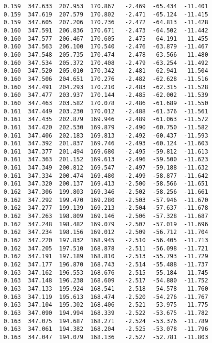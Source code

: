 \begin{verbatim}
   0.159  347.633  207.953  170.867   -2.469  -65.434  -11.401
   0.159  347.619  207.579  170.802   -2.471  -65.124  -11.415
   0.159  347.605  207.206  170.736   -2.472  -64.813  -11.428
   0.160  347.591  206.836  170.671   -2.473  -64.502  -11.442
   0.160  347.577  206.467  170.605   -2.475  -64.191  -11.455
   0.160  347.563  206.100  170.540   -2.476  -63.879  -11.467
   0.160  347.548  205.735  170.474   -2.478  -63.566  -11.480
   0.160  347.534  205.372  170.408   -2.479  -63.254  -11.492
   0.160  347.520  205.010  170.342   -2.481  -62.941  -11.504
   0.160  347.506  204.651  170.276   -2.482  -62.628  -11.516
   0.160  347.491  204.293  170.210   -2.483  -62.315  -11.528
   0.160  347.477  203.937  170.144   -2.485  -62.002  -11.539
   0.160  347.463  203.582  170.078   -2.486  -61.689  -11.550
   0.161  347.449  203.230  170.012   -2.488  -61.376  -11.561
   0.161  347.435  202.879  169.946   -2.489  -61.063  -11.572
   0.161  347.420  202.530  169.879   -2.490  -60.750  -11.582
   0.161  347.406  202.183  169.813   -2.492  -60.437  -11.593
   0.161  347.392  201.837  169.746   -2.493  -60.124  -11.603
   0.161  347.377  201.494  169.680   -2.495  -59.812  -11.613
   0.161  347.363  201.152  169.613   -2.496  -59.500  -11.623
   0.161  347.349  200.812  169.547   -2.497  -59.188  -11.632
   0.161  347.334  200.474  169.480   -2.499  -58.877  -11.642
   0.161  347.320  200.137  169.413   -2.500  -58.566  -11.651
   0.162  347.306  199.803  169.346   -2.502  -58.256  -11.661
   0.162  347.292  199.470  169.280   -2.503  -57.946  -11.670
   0.162  347.277  199.139  169.213   -2.504  -57.637  -11.678
   0.162  347.263  198.809  169.146   -2.506  -57.328  -11.687
   0.162  347.248  198.482  169.079   -2.507  -57.019  -11.696
   0.162  347.234  198.156  169.012   -2.509  -56.712  -11.704
   0.162  347.220  197.832  168.945   -2.510  -56.405  -11.713
   0.162  347.205  197.510  168.878   -2.511  -56.098  -11.721
   0.162  347.191  197.189  168.810   -2.513  -55.793  -11.729
   0.162  347.177  196.870  168.743   -2.514  -55.488  -11.737
   0.163  347.162  196.553  168.676   -2.515  -55.184  -11.745
   0.163  347.148  196.238  168.609   -2.517  -54.880  -11.752
   0.163  347.133  195.924  168.541   -2.518  -54.578  -11.760
   0.163  347.119  195.613  168.474   -2.520  -54.276  -11.767
   0.163  347.104  195.302  168.406   -2.521  -53.975  -11.775
   0.163  347.090  194.994  168.339   -2.522  -53.675  -11.782
   0.163  347.075  194.687  168.271   -2.524  -53.376  -11.789
   0.163  347.061  194.382  168.204   -2.525  -53.078  -11.796
   0.163  347.047  194.079  168.136   -2.527  -52.781  -11.803

\end{verbatim}
